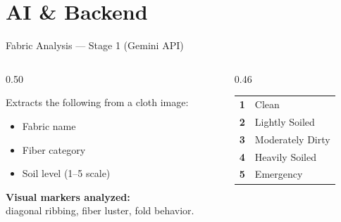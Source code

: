 \documentclass[aspectratio=169]{beamer}
\begin{document}
\section{AI \& Backend}

\begin{frame}{Fabric Analysis — Stage 1 (Gemini API)}
\begin{columns}[T]
\begin{column}{0.50\textwidth}
\begin{tcolorbox}[mycard, title={\faBrain\enspace Multi-Stage Prompt System}]
\small Extracts the following from a cloth image:
\begin{itemize}
  \item Fabric name
  \item Fiber category
  \item Soil level (1–5 scale)
\end{itemize}
\vspace{0.18cm}
\textbf{Visual markers analyzed:}\\
\textcolor{AccentBlue!80}{\small diagonal ribbing, fiber luster, fold behavior.}
\end{tcolorbox}
\end{column}
\begin{column}{0.46\textwidth}
\begin{tcolorbox}[accentcard, title={\faThermometerHalf\enspace Soil Level Scale}]
\small
\begin{tabular}{@{}cl@{}}
\textcolor{SuccessGreen}{\textbf{1}} & Clean \\[3pt]
\textcolor{AccentBlue}{\textbf{2}}   & Lightly Soiled \\[3pt]
\textcolor{CodeYellow}{\textbf{3}}   & Moderately Dirty \\[3pt]
\textcolor{WarnOrange}{\textbf{4}}   & Heavily Soiled \\[3pt]
\textcolor{red!80}{\textbf{5}}       & Emergency \\
\end{tabular}
\end{tcolorbox}
\end{column}
\end{columns}
\end{frame}
\end{document}

